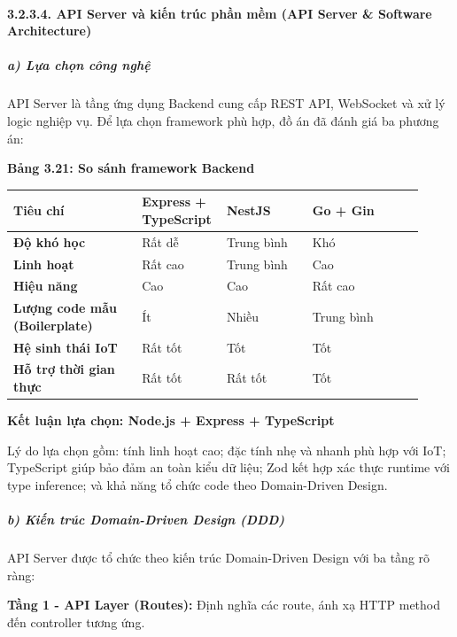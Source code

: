 \documentclass[13pt,a4paper]{extarticle}
\newcounter{none} %
\newcommand{\thesislongtableorignewline}{}
\let\thesislongtableorignewline\\
\renewcommand{\\}{\thesislongtableorignewline\hline}%
\let\\\thesislongtableorignewline
\newcommand{\thesistabletitle}[1]{%
  \begin{center}\textbf{#1}\end{center}%
}
\begin{document}
\paragraph{3.2.3.4. API Server và kiến trúc phần mềm (API Server \&
Software
Architecture)}\label{3234-api-server-vuxe0-kiux1ebfn-truxfac-phux1ea7n-mux1ec1m-api-server--software-architecture}

\subparagraph{a) Lựa chọn công
nghệ}\label{a-lux1ef1a-chux1ecdn-cuxf4ng-nghux1ec7}

API Server là tầng ứng dụng Backend cung cấp REST API, WebSocket và xử
lý logic nghiệp vụ. Để lựa chọn framework phù hợp, đồ án đã đánh giá ba
phương án:

\thesistabletitle{Bảng 3.21: So sánh framework Backend}

{\def\LTcaptype{none} %
\begin{longtable}{|p{0.30\linewidth}|p{0.16\linewidth}|p{0.20\linewidth}|p{0.26\linewidth}|}
\hline \textbf{Tiêu chí} & \textbf{Express + TypeScript} & \textbf{NestJS} & \textbf{Go + Gin} \\
\hline
\endhead
\hline
\endlastfoot
\textbf{Độ khó học} & Rất dễ & Trung bình & Khó \\
\textbf{Linh hoạt} & Rất cao & Trung bình & Cao \\
\textbf{Hiệu năng} & Cao & Cao & Rất cao \\
\textbf{Lượng code mẫu (Boilerplate)} & Ít & Nhiều & Trung bình \\
\textbf{Hệ sinh thái IoT} & Rất tốt & Tốt & Tốt \\
\textbf{Hỗ trợ thời gian thực} & Rất tốt & Rất tốt & Tốt \\
\end{longtable}
}

\textbf{Kết luận lựa chọn: Node.js + Express + TypeScript}

Lý do lựa chọn gồm: tính linh hoạt cao; đặc tính nhẹ và nhanh phù hợp
với IoT; TypeScript giúp bảo đảm an toàn kiểu dữ liệu; Zod kết hợp xác
thực runtime với type inference; và khả năng tổ chức code theo
Domain-Driven Design.

\subparagraph{b) Kiến trúc Domain-Driven Design
(DDD)}\label{b-kiux1ebfn-truxfac-domain-driven-design-ddd}

API Server được tổ chức theo kiến trúc Domain-Driven Design với ba tầng
rõ ràng:

\textbf{Tầng 1 - API Layer (Routes):} Định nghĩa các route, ánh xạ HTTP
method đến controller tương ứng.
\end{document}
